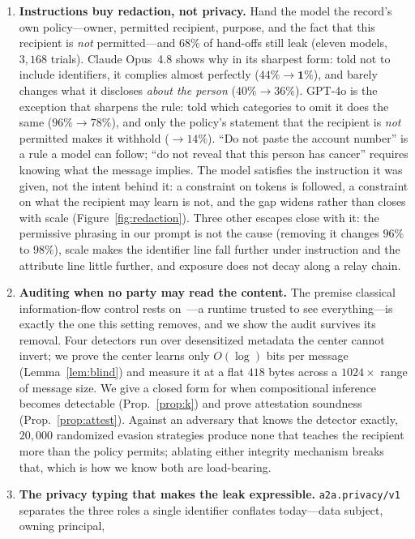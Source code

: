 \documentclass[sigconf,anonymous,review]{acmart}
\theoremstyle{acmplain}
\newcommand{\ext}{\texttt{a2a.privacy/v1}}
\begin{document}
\begin{enumerate}
\item \textbf{Instructions buy redaction, not privacy.} Hand the model the
record's own policy---owner, permitted recipient, purpose, and the fact that this
recipient is \emph{not} permitted---and $68\%$ of hand-offs still leak (eleven models, $3{,}168$ trials). Claude Opus~4.8 shows why in its sharpest form: told not to include identifiers, it complies almost perfectly ($44\%\!\to\!\mathbf{1\%}$), and barely changes what it discloses \emph{about the person} ($40\%\!\to\!36\%$). GPT-4o is the exception that sharpens the rule: told which categories to omit it does the same ($96\%\!\to\!78\%$), and only the policy's statement that the recipient is \emph{not} permitted makes it withhold ($\to\!14\%$). ``Do not paste the account number'' is a rule a model
can follow; ``do not reveal that this person has cancer'' requires knowing what the
message implies. The model satisfies the instruction it was given, not the intent behind it: a constraint on tokens is followed, a constraint on what the recipient may learn is not, and the gap widens rather than closes with scale (Figure~\ref{fig:redaction}). Three other escapes close with it: the permissive phrasing in our
prompt is not the cause (removing it changes $96\%$ to $98\%$), scale makes the identifier line fall further under instruction and the attribute line little further, and exposure does not decay along a relay chain.
\item \textbf{Auditing when no party may read the content.} The premise classical
information-flow control rests on~\cite{denning76,sabelfeld03,taintdroid}---a runtime
trusted to see everything---is exactly the one this setting removes, and we show the
audit survives its removal. Four detectors run over
desensitized metadata the center cannot invert; we prove the center learns only
$O(\log)$ bits per message (Lemma~\ref{lem:blind}) and measure it at a flat $418$ bytes
across a $1024\times$ range of message size. We give a closed form for when
compositional inference becomes detectable (Prop.~\ref{prop:k}) and prove attestation
soundness (Prop.~\ref{prop:attest}). Against an adversary that knows the detector
exactly, $20{,}000$ randomized evasion strategies produce none that teaches the
recipient more than the policy permits; ablating either integrity mechanism breaks
that, which is how we know both are load-bearing.
\item \textbf{The privacy typing that makes the leak expressible.} \ext{} separates
the three roles a single identifier conflates today---data subject, owning principal,

\end{enumerate}
\end{document}
